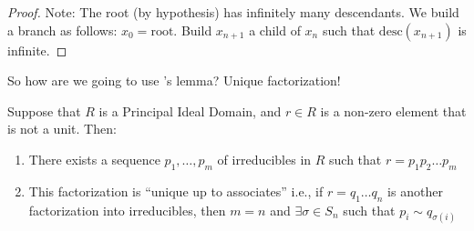 \documentclass[notes.tex]{subfiles}
\begin{document}
\begin{digression}
\begin{proof}
		Note: The root (by hypothesis) has infinitely many descendants. We build a branch as follows:
		$x_0 = \mathrm{root}$. Build $x_{n+1}$ a child of $x_n$ such that $\mathrm{desc}(x_{n+1})$ is infinite.
	\end{proof}
\end{digression}

So how are we going to use 's lemma? Unique factorization!

\begin{theorem}
	\label{uniquefact}
	Suppose that $R$ is a Principal Ideal Domain, and $r\in R$ is a non-zero element that is not a unit. Then:
	\begin{enumerate}
		\item There exists a sequence $p_1, \ldots, p_m$ of irreducibles in $R$ such that $r=p_1p_2\ldots p_m$
		\item This factorization is ``unique up to associates''
		i.e., if $r = q_1\ldots q_n$ is another factorization into irreducibles, then $m=n$ and $\exists\sigma\in S_n$ such that $p_i\sim q_{\sigma(i)}$
	\end{enumerate}
\end{theorem}
\end{document}
